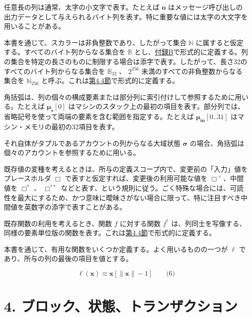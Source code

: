 \documentclass[
]{ltjsarticle}
\begin{document}
任意長の列は通常、太字の小文字で表す。たとえば \(\mathbf{o}\)
はメッセージ呼び出しの出力データとして与えられるバイト列を表す。特に重要な値には太字の大文字を用いることがある。

本書を通じて、スカラーは非負整数であり、したがって集合 \(\mathbb{N}\)
に属すると仮定する。すべてのバイト列からなる集合を \(\mathbb{B}\)
とし、\protect\hyperlink{app:rlp}{付録B}で形式的に定義する。列の集合を特定の長さのものに制限する場合は添字で表す。したがって、長さ32のすべてのバイト列からなる集合を
\(\mathbb{B}_{32}\) 、 \(2^{256}\) 未満のすべての非負整数からなる集合を
\(\mathbb{N}_{256}\)
と呼ぶ。これは\protect\hyperlink{subsec:The_Block}{第4.4節}で形式的に定義する。

角括弧は、列の個々の構成要素または部分列に索引付けして参照するために用いる。たとえば
\(\boldsymbol{\mu}_{\mathbf{s}}[0]\)
はマシンのスタック上の最初の項目を表す。部分列では、省略記号を使って両端の要素を含む範囲を指定する。たとえば
\(\boldsymbol{\mu}_{\mathbf{m}}[0..31]\)
はマシン・メモリの最初の32項目を表す。

それ自体がタプルであるアカウントの列からなる大域状態
\(\boldsymbol{\sigma}\)
の場合、角括弧は個々のアカウントを参照するために用いる。

既存値の変種を考えるときは、所与の定義スコープ内で、変更前の「入力」値をプレースホルダ
\(\Box\) で表すと仮定すれば、変更後の利用可能な値を \(\Box'\) 、中間値を
\(\Box^{*}\) 、 \(\Box^{**}\)
などと表す、という規則に従う。ごく特殊な場合には、可読性を最大にするため、かつ意味に曖昧さがない場合に限って、特に注目すべき中間値を英数字の添字で表すことがある。

既存関数の利用を考えるとき、関数 \(f\) に対する関数
\protect\hyperlink{general_element_wise_sequence_transformation_f_pow_asterisk}{\(f^{*}\)}
は、列同士を写像する、同様の要素単位版の関数を表す。これは\protect\hyperlink{subsec:The_Block}{第4.4節}で形式的に定義する。

本書を通じて、有用な関数をいくつか定義する。よく用いるものの一つが
\(\ell\) であり、所与の列の最後の項目を値とする。

\protect\hypertarget{eq-6}{}{}

\[\ell(\mathbf{x}) \equiv \mathbf{x}[\lVert \mathbf{x} \rVert - 1] \qquad \text{(6)}\]

\protect\hypertarget{ch:bst}{}{}

\hypertarget{ux30d6ux30edux30c3ux30afux72b6ux614bux30c8ux30e9ux30f3ux30b6ux30afux30b7ux30e7ux30f3}{%
\section{4.
ブロック、状態、トランザクション}\label{ux30d6ux30edux30c3ux30afux72b6ux614bux30c8ux30e9ux30f3ux30b6ux30afux30b7ux30e7ux30f3}}
\end{document}
